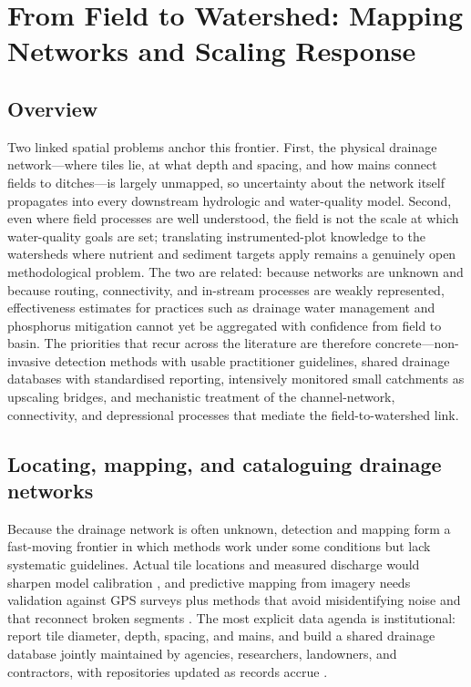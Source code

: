 \section{From Field to Watershed: Mapping Networks and Scaling Response}

\subsection{Overview}

Two linked spatial problems anchor this frontier. First, the physical drainage
network---where tiles lie, at what depth and spacing, and how mains connect
fields to ditches---is largely unmapped, so uncertainty about the network
itself propagates into every downstream hydrologic and water-quality model.
Second, even where field processes are well understood, the field is not the
scale at which water-quality goals are set; translating instrumented-plot
knowledge to the watersheds where nutrient and sediment targets apply remains a
genuinely open methodological problem. The two are related: because networks
are unknown and because routing, connectivity, and in-stream processes are
weakly represented, effectiveness estimates for practices such as drainage
water management and phosphorus mitigation cannot yet be aggregated with
confidence from field to basin. The priorities that recur across the literature
are therefore concrete---non-invasive detection methods with usable
practitioner guidelines, shared drainage databases with standardised reporting,
intensively monitored small catchments as upscaling bridges, and mechanistic
treatment of the channel-network, connectivity, and depressional processes that
mediate the field-to-watershed link.

\subsection{Locating, mapping, and cataloguing drainage networks}

Because the drainage network is often unknown, detection and mapping form a
fast-moving frontier in which methods work under some conditions but lack
systematic guidelines. Actual tile locations and measured discharge would
sharpen model calibration \parencite{Amado2018}, and predictive mapping from
imagery needs validation against GPS surveys plus methods that avoid
misidentifying noise and that reconnect broken segments
\parencite{Naz2009,Schilling2019}. The most explicit data agenda is
institutional: report tile diameter, depth, spacing, and mains, and build a
shared drainage database jointly maintained by agencies, researchers,
landowners, and contractors, with repositories updated as records accrue
\parencite{Zhou2025,Valayamkunnath2020}.

